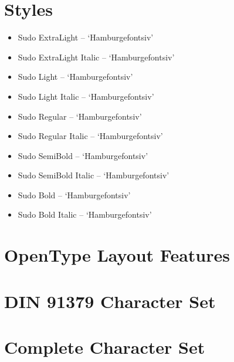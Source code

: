 \documentclass[paper=a4, 12pt]{scrbook}
\begin{document}
\section{Styles}
{\large
\begin{itemize}
	\item { Sudo ExtraLight – ‘Hamburgefontsiv’}
	\item { Sudo ExtraLight Italic – ‘Hamburgefontsiv’}
	\item { Sudo Light – ‘Hamburgefontsiv’}
	\item { Sudo Light Italic – ‘Hamburgefontsiv’}
	\item { Sudo Regular – ‘Hamburgefontsiv’}
	\item { Sudo Regular Italic – ‘Hamburgefontsiv’}
	\item { Sudo SemiBold – ‘Hamburgefontsiv’}
	\item { Sudo SemiBold Italic – ‘Hamburgefontsiv’}
	\item { Sudo Bold – ‘Hamburgefontsiv’}
	\item { Sudo Bold Italic – ‘Hamburgefontsiv’}
\end{itemize}}

\section{OpenType Layout Features}



\section{DIN 91379 Character Set}


\section{Complete Character Set}


\end{document}
